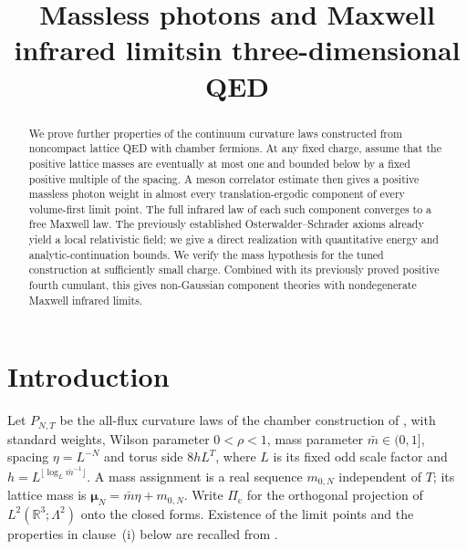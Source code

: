 \documentclass[11pt,letterpaper,reqno]{amsart}
\theoremstyle{definition}
\begin{document}
\title[Massless photons and Maxwell infrared limits]{Massless photons and Maxwell infrared limits\newline in three-dimensional QED}
\date{}
\begin{abstract}
We prove further properties of the continuum curvature laws constructed
from noncompact lattice QED with chamber fermions. At any fixed charge,
assume that the positive lattice masses are eventually at most one and
bounded below by a fixed positive multiple of the spacing. A meson
correlator estimate then gives a positive massless photon weight in
almost every translation-ergodic component of every volume-first limit
point. The full infrared law of each such component converges to a free
Maxwell law. The previously established Osterwalder--Schrader axioms
already yield a local relativistic field; we give a direct
realization with quantitative energy and analytic-continuation bounds.
We verify the mass hypothesis for the tuned construction at sufficiently
small charge. Combined with its previously proved positive fourth
cumulant, this gives non-Gaussian component theories with nondegenerate
Maxwell infrared limits.
\end{abstract}
\maketitle
\tableofcontents

\section*{Introduction}

Let $P_{N,T}$ be the all-flux curvature laws of the chamber construction of
\cite{QEDII,QEDIII}, with standard weights, Wilson parameter $0<\rho<1$,
mass parameter $\bar m\in(0,1]$, spacing $\eta=L^{-N}$ and torus side
$8hL^T$, where $L$ is its fixed odd scale factor and
$h=L^{\lfloor\log_L\bar m^{-1}\rfloor}$.
A mass assignment is a real sequence $m_{0,N}$ independent of $T$;
its lattice mass is $\boldsymbol\mu_N=\bar m\eta+m_{0,N}$.
Write $\Pi_{\mathrm c}$ for the orthogonal projection of
$L^2(\mathbb R^3;\Lambda^2)$ onto the closed forms.
Existence of the limit points and the properties in clause~(i) below
are recalled from \cite[Theorems~1.3 and~1.4]{QEDII}.
\end{document}
